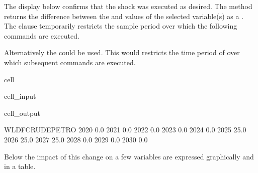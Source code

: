 \documentclass[letterpaper,10pt,english]{jupyterBook}
\begin{document}
\sphinxAtStartPar
The display below confirms that the shock was executed as desired. The  method returns the difference between the  and  values of the selected variable(s) as a . The  clause temporarily restricts the sample period over which the following  commands are executed.

\sphinxAtStartPar
Alternatively the could be used. This would restricts the time period of over which  subsequent commands are executed.

\begin{sphinxuseclass}{cell}\begin{sphinxVerbatimInput}

\begin{sphinxuseclass}{cell_input}
\begin{sphinxVerbatim}[commandchars=\\\{\}]
 
    \PYG{p}{[}\PYG{p}{]}
\end{sphinxVerbatim}

\end{sphinxuseclass}\end{sphinxVerbatimInput}
\begin{sphinxVerbatimOutput}

\begin{sphinxuseclass}{cell_output}
\begin{sphinxVerbatim}[commandchars=\\\{\}]
      WLDFCRUDE\PYGZus{}PETRO
2020              0.0
2021              0.0
2022              0.0
2023              0.0
2024              0.0
2025             25.0
2026             25.0
2027             25.0
2028              0.0
2029              0.0
2030              0.0
\end{sphinxVerbatim}

\end{sphinxuseclass}\end{sphinxVerbatimOutput}

\end{sphinxuseclass}
\sphinxAtStartPar
Below the impact of this change on a few variables are expressed graphically and in a table.
\end{document}
